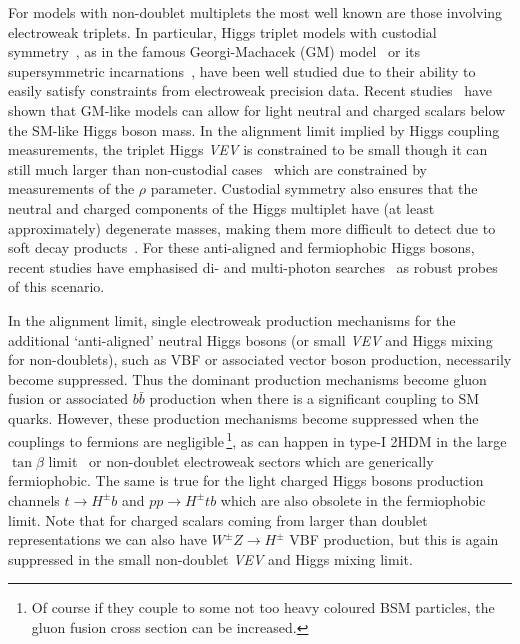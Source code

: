 \documentclass[../report.tex]{subfiles}
\begin{document}
For models with non-doublet multiplets the most well known are those involving electroweak triplets. In particular, Higgs triplet models with custodial symmetry~\cite{Sikivie:1980hm}, as in the famous Georgi-Machacek (GM) model~\cite{Georgi:1985nv,Chanowitz:1985ug,Gunion:1989ci,Gunion:1990dt,Hartling:2014zca} or its supersymmetric incarnations~\cite{Cort:2013foa,Garcia-Pepin:2014yfa,Vega:2017gkk}, have been well studied due to their ability to easily satisfy constraints from electroweak precision data. Recent studies~\cite{Davoudiasl:2004aj,Vega:2017gkk,Vega:2018ddp} have shown that GM-like models can allow for light neutral and charged scalars below the SM-like Higgs boson mass. In the alignment limit implied by Higgs coupling measurements, the triplet Higgs \emph{VEV} is constrained to be small though it can still much larger than non-custodial cases~\cite{Tanabashi:2018oca,Haber:1999zh} which are constrained by measurements of the $\rho$ parameter. Custodial symmetry also ensures that the neutral and charged components of the Higgs multiplet have (at least approximately) degenerate masses, making them more difficult to detect due to soft decay products~\cite{Buckley:2009kv,Ismail:2016zby}. For these anti-aligned and fermiophobic Higgs bosons, recent studies have emphasised di- and multi-photon searches~\cite{Aaltonen:2016fnw,Delgado:2016arn,Brooijmans:2016vro,Vega:2018ddp} as robust probes of this scenario.

\label{sec:pheno}

In the alignment limit, single electroweak production mechanisms for the
additional `anti-aligned' neutral Higgs bosons (or small \emph{VEV} and Higgs mixing for non-doublets), such as VBF or associated vector boson production, necessarily become suppressed. Thus the dominant production mechanisms become gluon fusion or associated $b\bar{b}$ production when there is a significant coupling to SM quarks. However, these production mechanisms become suppressed when the couplings to fermions are negligible\,\footnote{Of course if they couple to some not too heavy coloured BSM particles, the gluon fusion cross section can be increased.}, as can happen in type-I 2HDM in the large $\tan\beta$ limit~\cite{Akeroyd:2003bt} or non-doublet electroweak sectors which are generically fermiophobic. The same is true for the light charged Higgs bosons production channels $t \to H^\pm b$ and $pp \to H^\pm t b$ which are also obsolete in the fermiophobic limit. Note that for charged scalars coming from larger than doublet representations we can also have $W^\pm Z \to H^\pm$ VBF production, but this is again suppressed in the small non-doublet \emph{VEV} and Higgs mixing limit. 
\end{document}
